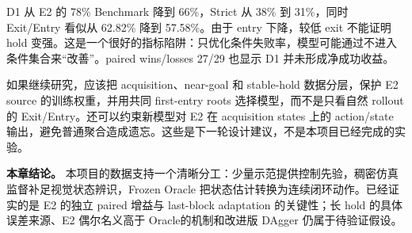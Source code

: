 D1 从 E2 的 78\% Benchmark 降到 66\%，Strict 从 38\% 到 31\%，同时 Exit/Entry 看似从 62.82\% 降到 57.58\%。由于 entry 下降，较低 exit 不能证明 hold 变强。这是一个很好的指标陷阱：只优化条件失败率，模型可能通过不进入条件集合来``改善''。paired wins/losses 27/29 也显示 D1 并未形成净成功收益。

如果继续研究，应该把 acquisition、near-goal 和 stable-hold 数据分层，保护 E2 source 的训练权重，并用共同 first-entry roots 选择模型，而不是只看自然 rollout 的 Exit/Entry。还可以约束新模型对 E2 在 acquisition states 上的 action/state 输出，避免普通聚合造成遗忘。这些是下一轮设计建议，不是本项目已经完成的实验。

\textbf{本章结论。} 本项目的数据支持一个清晰分工：少量示范提供控制先验，稠密仿真监督补足视觉状态辨识，Frozen Oracle 把状态估计转换为连续闭环动作。已经证实的是 E2 的独立 paired 增益与 last-block adaptation 的关键性；长 hold 的具体误差来源、E2 偶尔名义高于 Oracle的机制和改进版 DAgger 仍属于待验证假设。
